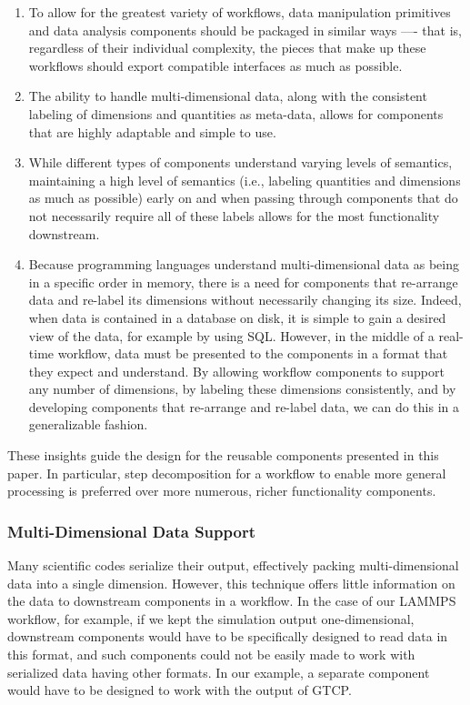 \documentclass[conference]{IEEEtran}
\begin{document}
\begin{enumerate}

\item To allow for the greatest variety of workflows, data manipulation
primitives and data analysis components should be packaged in similar ways —-
that is, regardless of their individual complexity, the pieces that make up
these workflows should export compatible interfaces as much as possible.

\item The ability to handle multi-dimensional data, along with the consistent
labeling of dimensions and quantities as meta-data, allows for components that
are highly adaptable and simple to use.

\item While different types of components understand varying levels of
semantics, maintaining a high level of semantics (i.e., labeling quantities and
dimensions as much as possible) early on and when passing through components
that do not necessarily require all of these labels allows for the most
functionality downstream.

\item Because programming languages understand multi-dimensional data as being
in a specific order in memory, there is a need for components that re-arrange
data and re-label its dimensions without necessarily changing its size. Indeed,
when data is contained in a database on disk, it is simple to gain a desired
view of the data, for example by using SQL. However, in the middle of a
real-time workflow, data must be presented to the components in a format that
they expect and understand. By allowing workflow components to support any
number of dimensions, by labeling these dimensions consistently, and by
developing components that re-arrange and re-label data, we can do this in a
generalizable fashion.

\end{enumerate}

These insights guide the design for the reusable components presented in this
paper. In particular, step decomposition for a workflow to enable more general
processing is preferred over more numerous, richer functionality components.

\subsubsection{Multi-Dimensional Data Support}

Many scientific codes serialize their output, effectively packing
multi-dimensional data into a single dimension. However, this technique offers
little information on the data to downstream components in a workflow. In the
case of our LAMMPS workflow, for example, if we kept the simulation output
one-dimensional, downstream components would have to be specifically designed
to read data in this format, and such components could not be easily made to
work with serialized data having other formats. In our example, a separate
component would have to be designed to work with the output of GTCP.
\end{document}

